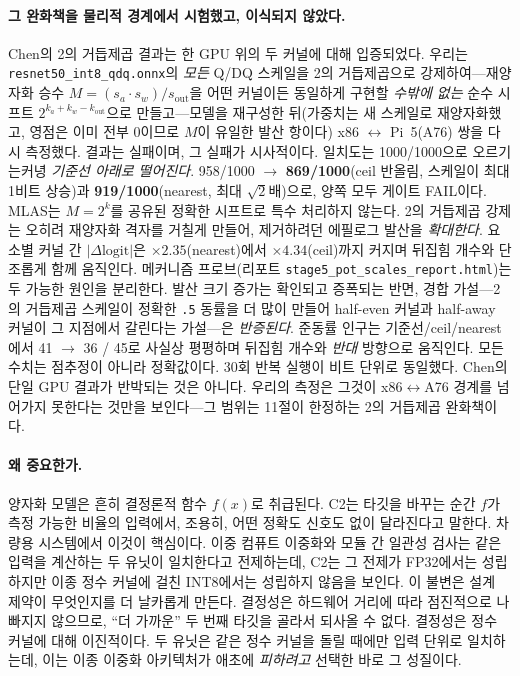 \documentclass[11pt]{article}
\begin{document}
\paragraph{그 완화책을 물리적 경계에서 시험했고, 이식되지 않았다.}
Chen의 2의 거듭제곱 결과는 한 GPU 위의 두 커널에 대해 입증되었다. 우리는 \texttt{resnet50\_int8\_qdq.onnx}의 \emph{모든} Q/DQ 스케일을 2의 거듭제곱으로 강제하여---재양자화 승수 $M = (s_a \cdot s_w)/s_\mathrm{out}$을 어떤 커널이든 동일하게 구현할 \emph{수밖에 없는} 순수 시프트 $2^{k_a + k_w - k_\mathrm{out}}$으로 만들고---모델을 재구성한 뒤(가중치는 새 스케일로 재양자화했고, 영점은 이미 전부 0이므로 $M$이 유일한 발산 항이다) x86 $\leftrightarrow$ Pi~5(A76) 쌍을 다시 측정했다. 결과는 실패이며, 그 실패가 시사적이다. 일치도는 1000/1000으로 오르기는커녕 \emph{기준선 아래로 떨어진다}. 958/1000 $\to$ \textbf{869/1000}(ceil 반올림, 스케일이 최대 1비트 상승)과 \textbf{919/1000}(nearest, 최대 $\sqrt{2}$배)으로, 양쪽 모두 게이트 FAIL이다. MLAS는 $M = 2^k$를 공유된 정확한 시프트로 특수 처리하지 않는다. 2의 거듭제곱 강제는 오히려 재양자화 격자를 거칠게 만들어, 제거하려던 에필로그 발산을 \emph{확대한다}. 요소별 커널 간 $|\Delta\mathrm{logit}|$은 $\times2.35$(nearest)에서 $\times4.34$(ceil)까지 커지며 뒤집힘 개수와 단조롭게 함께 움직인다. 메커니즘 프로브(리포트 \texttt{stage5\_pot\_scales\_report.html})는 두 가능한 원인을 분리한다. 발산 크기 증가는 확인되고 증폭되는 반면, 경합 가설---2의 거듭제곱 스케일이 정확한 \texttt{.5} 동률을 더 많이 만들어 half-even 커널과 half-away 커널이 그 지점에서 갈린다는 가설---은 \emph{반증된다}. 준동률 인구는 기준선/ceil/nearest에서 41 $\to$ 36 / 45로 사실상 평평하며 뒤집힘 개수와 \emph{반대} 방향으로 움직인다. 모든 수치는 점추정이 아니라 정확값이다. 30회 반복 실행이 비트 단위로 동일했다. Chen의 단일 GPU 결과가 반박되는 것은 아니다. 우리의 측정은 그것이 x86$\leftrightarrow$A76 경계를 넘어가지 못한다는 것만을 보인다---그 범위는 11절이 한정하는 2의 거듭제곱 완화책이다.

\paragraph{왜 중요한가.}
양자화 모델은 흔히 결정론적 함수 $f(x)$로 취급된다. C2는 타깃을 바꾸는 순간 $f$가 측정 가능한 비율의 입력에서, 조용히, 어떤 정확도 신호도 없이 달라진다고 말한다. 차량용 시스템에서 이것이 핵심이다. 이중 컴퓨트 이중화와 모듈 간 일관성 검사는 같은 입력을 계산하는 두 유닛이 일치한다고 전제하는데, C2는 그 전제가 FP32에서는 성립하지만 이종 정수 커널에 걸친 INT8에서는 성립하지 않음을 보인다. 이 불변은 설계 제약이 무엇인지를 더 날카롭게 만든다. 결정성은 하드웨어 거리에 따라 점진적으로 나빠지지 않으므로, ``더 가까운'' 두 번째 타깃을 골라서 되사올 수 없다. 결정성은 정수 커널에 대해 이진적이다. 두 유닛은 같은 정수 커널을 돌릴 때에만 입력 단위로 일치하는데, 이는 이종 이중화 아키텍처가 애초에 \emph{피하려고} 선택한 바로 그 성질이다.
\end{document}
